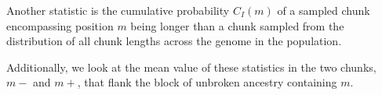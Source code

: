 \documentclass[11pt,letterpaper]{article}
\begin{document}
Another statistic is the cumulative probability $C_I(m)$ of a sampled chunk encompassing position $m$ being longer than a chunk sampled from the distribution of all chunk lengths across the genome in the population. 

Additionally, we look at the mean value of these statistics in the two chunks, $m-$ and $m+$, that flank the block of unbroken ancestry containing $m$.














\end{document}
